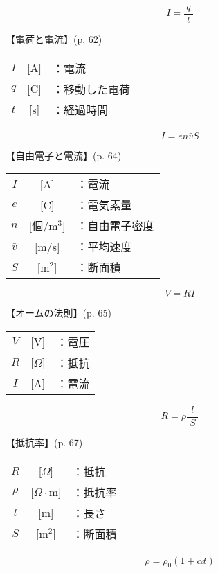 \documentclass[10pt]{jarticle}
\begin{document}
\newpage
\[
I = \frac{q}{\; t \;}
\]


\vskip3mm
\noindent
【電荷と電流】{\footnotesize (p. 62)}


\begin{tabular}{ccl}
$I$	&[A]	&：電流 \\
$q$	&[C]	&：移動した電荷\\
$t$	&[s]	&：経過時間
\end{tabular}




\newpage
\[
I = en \bar{v} S
\]


\vskip3mm
\noindent
【自由電子と電流】{\footnotesize (p. 64)}


\begin{tabular}{ccl}
$I$	&[A]	&：電流 \\
$e$	&[C]	&：電気素量\\
$n$	&[個/m$^3$]	&：自由電子密度\\
$\bar{v}$	&[m/s]	&：平均速度\\
$S$	&[m$^2$]	&：断面積
\end{tabular}






\newpage
\[
V = R I
\]


\vskip3mm
\noindent
【オームの法則】{\footnotesize (p. 65)}

\begin{tabular}{ccl}
$V$	& [V]	&：電圧\\
$R$	&[$\Omega$]	&：抵抗\\
$I$	&[A]	&：電流
\end{tabular}



\newpage
\[
R = \rho \frac{l}{\; S \;}
\]


\vskip3mm
\noindent
【抵抗率】{\footnotesize (p. 67)}

\begin{tabular}{ccl}
$R$	&[$\Omega$]	&：抵抗\\
$\rho$	&[$\Omega \cdot $m]	&：抵抗率\\
$l$	&[m]	&：長さ\\
$S$	&[m$^2$]	&：断面積
\end{tabular}





\newpage
\[
\rho = \rho_0 (1 + \alpha t)
\]
\end{document}
